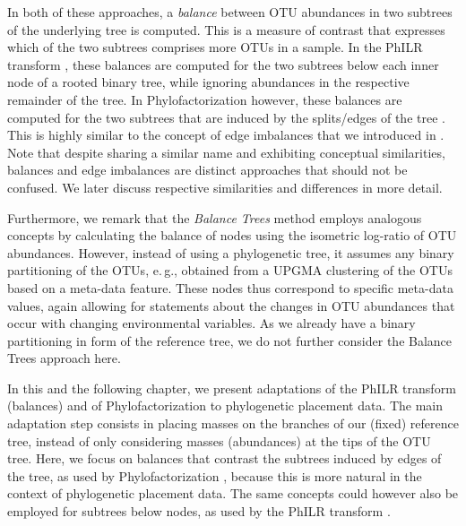 
In both of these approaches, a \emph{balance} between OTU abundances in two subtrees of the underlying tree is computed.
This is a measure of contrast that expresses which of the two subtrees comprises more OTUs in a sample.
In the PhILR transform  \cite{Silverman2017}, these balances are computed
for the two subtrees below each inner node of a rooted binary tree,
while ignoring abundances in the respective remainder of the tree.
In Phylofactorization however, these balances are computed
for the two subtrees that are induced by the splits/edges of the tree \cite{Washburne2017a}.
This is highly similar to the concept of edge imbalances 
that we introduced in .
Note that despite sharing a similar name and exhibiting conceptual similarities,
balances and edge imbalances are distinct approaches that should not be confused.
We later discuss respective similarities and differences in more detail.

Furthermore, we remark that the \emph{Balance Trees} method \cite{Morton2017} employs analogous concepts
by calculating the balance of nodes using the isometric log-ratio of OTU abundances.
However, instead of using a phylogenetic tree, it assumes any binary partitioning of the OTUs,
e.\,g., obtained from a UPGMA clustering \cite{Legendre1998} of the OTUs based on a meta-data feature.
These nodes thus correspond to specific meta-data values,
again allowing for statements about the changes in OTU abundances that occur with changing environmental variables.
As we already have a binary partitioning in form of the reference tree,
we do not further consider the Balance Trees approach here.

In this and the following chapter, we present adaptations of the PhILR transform (balances)
and of Phylofactorization to phylogenetic placement data.
The main adaptation step consists in placing masses on the branches of our (fixed) reference tree,
instead of only considering masses (abundances) at the tips of the OTU tree.
Here, we focus on balances that contrast the subtrees induced by edges of the tree,
as used by Phylofactorization \cite{Washburne2017a},
because this is more natural in the context of phylogenetic placement data.
The same concepts could however also be employed for subtrees below nodes,
as used by the PhILR transform \cite{Silverman2017}.

